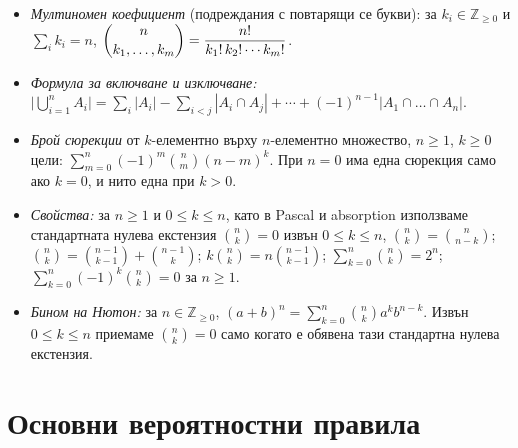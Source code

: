 \begin{itemize}\itemsep2pt
  \item \emph{Мултиномен коефициент} (подреждания с повтарящи се букви): за
        $k_i\in\mathbb Z_{\ge0}$ и $\sum_i k_i=n$,
        $\dbinom{n}{k_1,\dots,k_m} = \dfrac{n!}{k_1!\,k_2!\cdots k_m!}$.
  \item \emph{Формула за включване и изключване:}
        $\displaystyle \Big|\bigcup_{i=1}^{n} A_i\Big|
          = \sum_i |A_i| - \sum_{i<j} |A_i \cap A_j| + \cdots + (-1)^{n-1}|A_1 \cap \dots \cap A_n|$.
  \item \emph{Брой сюрекции} от $k$-елементно върху $n$-елементно множество,
        $n\ge1$, $k\ge0$ цели:
        $\displaystyle \sum_{m=0}^{n} (-1)^m \binom{n}{m} (n-m)^k$.
        При $n=0$ има една сюрекция само ако $k=0$, и нито една при $k>0$.
  \item \emph{Свойства:} за $n\ge1$ и $0\le k\le n$, като в Pascal и
        absorption използваме стандартната нулева екстензия
        $\binom nk=0$ извън $0\le k\le n$,
        $\binom{n}{k} = \binom{n}{n-k}$;\quad
        $\binom{n}{k} = \binom{n-1}{k-1} + \binom{n-1}{k}$;\quad
        $k\binom{n}{k} = n\binom{n-1}{k-1}$;\quad
        $\sum_{k=0}^{n} \binom{n}{k} = 2^n$;\quad
        $\sum_{k=0}^{n}(-1)^k\binom{n}{k} = 0$ за $n \ge 1$.
  \item \emph{Бином на Нютон:} за $n\in\mathbb Z_{\ge0}$,
        $(a+b)^n = \sum_{k=0}^{n} \binom{n}{k} a^k b^{n-k}$.
        Извън $0\le k\le n$ приемаме $\binom nk=0$ само когато е обявена
        тази стандартна нулева екстензия.
\end{itemize}

\section{Основни вероятностни правила}

